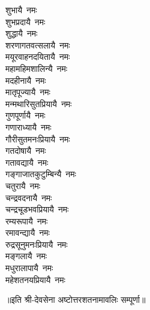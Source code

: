 \begin{flushleft}
\begin{multicols}{2}
शुभायै~नमः\\
शुभप्रदायै~नमः\\
शुद्धायै~नमः\\
शरणागतवत्सलायै~नमः\\
मयूरवाहनदयितायै~नमः\\
महामहिमशालिन्यै~नमः\hfill{}\\
मदहीनायै~नमः\\
मातृपूज्यायै~नमः\\
मन्मथारिसुतप्रियायै~नमः\\
गुणपूर्णायै~नमः\\
गणाराध्यायै~नमः\\
गौरीसुतमनःप्रियायै~नमः\\
गतदोषायै~नमः\\
गतावद्यायै~नमः\\
गङ्गाजातकुटुम्बिन्यै~नमः\\
चतुरायै~नमः\hfill{}\\
चन्द्रवदनायै~नमः\\
चन्द्रचूडभवप्रियायै~नमः\\
रम्यरूपायै~नमः\\
रमावन्द्यायै~नमः\\
रुद्रसूनुमनःप्रियायै~नमः\\
मङ्गलायै~नमः\\
मधुरालापायै~नमः\\
महेशतनयप्रियायै~नमः\\
\end{multicols}
\end{flushleft}
॥इति श्री-देवसेना अष्टोत्तरशतनामावलिः सम्पूर्णा॥
